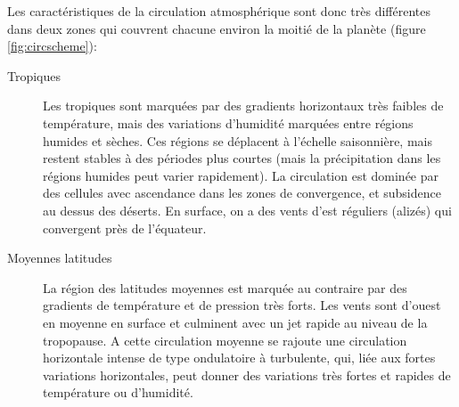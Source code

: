 \sk
Les caractéristiques de la circulation atmosphérique sont donc très différentes dans deux zones qui couvrent chacune environ la moitié de la planète (figure \ref{fig:circscheme}):
\begin{description}
\item[Tropiques] Les tropiques sont marquées par des gradients horizontaux très faibles de température, mais des variations d'humidité marquées entre régions humides et sèches. Ces régions se déplacent à l'échelle saisonnière, mais restent stables à des périodes plus courtes (mais la précipitation dans les régions humides peut varier rapidement). La circulation est dominée par des cellules avec ascendance dans les zones de convergence, et subsidence au dessus des déserts. En surface, on a des vents d'est réguliers (alizés) qui convergent près de l'équateur.
\item[Moyennes latitudes] La région des latitudes moyennes est marquée au contraire par des gradients de température et de pression très forts. Les vents sont d'ouest en moyenne en surface et culminent avec un jet rapide au niveau de la tropopause. A cette circulation moyenne se rajoute une circulation horizontale intense de type ondulatoire à turbulente, qui, liée aux fortes variations horizontales, peut donner des variations très fortes et rapides de température ou d'humidité.
\end{description}


%

